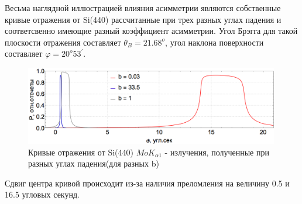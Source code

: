 Весьма наглядной иллюстрацией влияния асимметрии являются собственные
кривые отражения от Si(440) рассчитанные при
трех разных углах падения и соответсвенно имеющие разный коэффициент асимметрии. Угол
Брэгга для такой плоскости отражения составляет $\theta_B = 21.68^o$, угол наклона поверхности
составляет $\varphi = 20^o 53^{'}$.

\begin{figure}[H]
\centering
\includegraphics[width=0.99\textwidth]{images/rocking_curve_assym_3.png}
\caption{Кривые отражения от Si(440) $MoK_{\alpha 1}$ - излучения, полученные при разных углах падения(для разных b)}
\label{ris:rocking_curve_assym_3}
\end{figure}
Сдвиг центра кривой происходит из-за наличия преломления на величину 0.5 и 16.5 угловых секунд.
%
